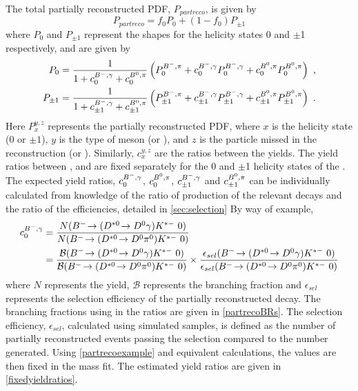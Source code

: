 The total partially reconstructed PDF, $P_{partreco}$, is given by
\begin{equation}
P_{partreco} = f_0P_0 + (1 - f_0)P_{\pm 1}
\label{partrecofunction}
\end{equation}
where $P_0$ and $P_{\pm 1}$ represent the shapes for the \Dstar helicity states 0 and $\pm$1 respectively, and are given by
\begin{align*}
P_0 &= \frac{1}{1 + c^{{{{B}^-}},\gamma}_0 + c^{{{B}^0},\pi}_0} \left( P^{{{{B}^-}},\pi}_0 + c^{{{{B}^-}},\gamma}_0P^{{{{B}^-}},\gamma}_0 + c^{{{B}^0},\pi}_0P^{{{B}^0},\pi}_0 \right) \text{ ,} \\
P_{\pm 1} &= \frac{1}{1 + c^{{{{B}^-}},\gamma}_{\pm 1} + c^{{{B}^0},\pi}_{\pm 1}} \left( P^{{{{B}^-}},\pi}_{\pm 1} + c^{{{{B}^-}},\gamma}_{\pm 1}P^{{{{B}^-}},\gamma}_{\pm 1} + c^{{{B}^0},\pi}_{\pm 1}P^{{{B}^0},\pi}_{\pm 1} \right) \text{ .}
\end{align*}
Here $P_x^{y,z}$ represents the partially reconstructed PDF, where $x$ is the \Dstar helicity state ($0$ or $\pm 1$), $y$ is the type of \B meson (\Bm or \Bd), and $z$ is the particle missed in the reconstruction (\pion or \Pgamma). Similarly, $c_x^{y,z}$ are the ratios between the yields. The yield ratios between \decay{\Bm}{(\decay{\Dstarz}{\Dz[\piz]})\Kstarm}, \decay{\Bm}{(\decay{\Dstarz}{\Dz[\gamma]})\Kstarm} and \decay{\Bd}{(\decay{\Dstarp}{\Dz[\pip]})\Kstarm} are fixed separately for the 0 and $\pm$1 helicity states of the \Dstar. The expected yield ratios, $c^{{{{B}^-}},\gamma}_0$, $c^{{{B}^0},\pi}_0$, $c^{{{{B}^-}},\gamma}_{\pm 1}$ and $c^{{{B}^0},\pi}_{\pm 1}$ can be individually calculated from knowledge of the ratio of production of the relevant decays and the ratio of the efficiencies, detailed in \sect\ref{sec:selection} By way of example, 
\begin{align}
c^{\Bm,\gamma}_0 &= \frac{N(\decay{\Bm}{(\decay{\Dstarz}{\Dz\gamma})\Kstarm}\ 0)}{N(\decay{\Bm}{(\decay{\Dstarz}{\Dz\piz})\Kstarm}\ 0)} \nonumber \\ 
&= \frac{\mathcal{B}(\decay{\Bm}{(\decay{\Dstarz}{\Dz\gamma})\Kstarm}\ 0)}{\mathcal{B}(\decay{\Bm}{(\decay{\Dstarz}{\Dz\piz})\Kstarm}\ 0)} \times \frac{\epsilon_{sel}(\decay{\Bm}{(\decay{\Dstarz}{\Dz\gamma})\Kstarm}\ 0)}{\epsilon_{sel}(\decay{\Bm}{(\decay{\Dstarz}{\Dz\piz})\Kstarm}\ 0)}
\label{partrecoexample}
\end{align}
where $N$ represents the yield, $\mathcal{B}$ represents the branching fraction and $\epsilon_{sel}$ represents the selection efficiency of the partially reconstructed decay. The branching fractions using in the ratios are given in \tab\ref{partrecoBRs}. The selection efficiency, $\epsilon_{sel}$, calculated using simulated samples, is defined as the number of partially reconstructed events passing the selection compared to the number generated. Using \eqn\ref{partrecoexample} and equivalent calculations, the values are then fixed in the mass fit. The estimated yield ratios are given in \tab\ref{fixedyieldratios}. 


